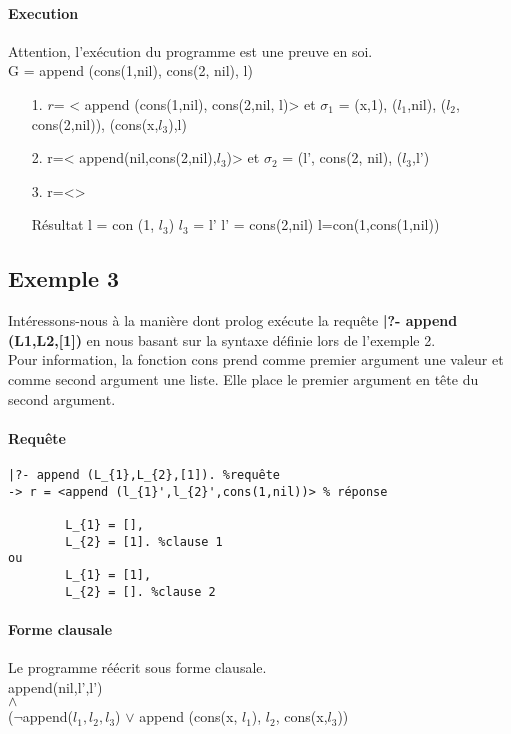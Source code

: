 \paragraph{Execution}
Attention, l'exécution du programme est une preuve en soi.\\
G = append (cons(1,nil), cons(2, nil), l)
\begin{itemize}
\item[1.] 
		$r$= < append (cons(1,nil), cons(2,nil, l)> et
		$\sigma_1$ = {(x,1), ($l_1$,nil), ($l_2$, cons(2,nil)), (cons(x,$l_3$),l)}
\item[2.]
		r=< append(nil,cons(2,nil),$l_3$)> et
		$\sigma_2$ = { (l', cons(2, nil), ($l_3$,l') }
		
\item[3.]
		r=<>
		
\item[Résultat]
l = con (1, $l_3$)
$l_3$ = l'
l' = cons(2,nil)
l=con(1,cons(1,nil))


\end{itemize}

\subsection{Exemple 3}

Intéressons-nous à la manière dont prolog exécute la requête \textbf{|?- append (L1,L2,[1])} en nous basant sur la syntaxe définie lors de l'exemple 2.\\
Pour information, la fonction cons prend comme premier argument une valeur et comme second argument une liste. Elle place le premier argument en tête du second argument.\\

\paragraph{Requête}
\begin{verbatim} 
|?- append (L_{1},L_{2},[1]). %requête
-> r = <append (l_{1}',l_{2}',cons(1,nil))> % réponse

		L_{1} = [],
		L_{2} = [1]. %clause 1
ou		
		L_{1} = [1],
		L_{2} = []. %clause 2
\end{verbatim}

\paragraph{Forme clausale}
Le programme réécrit sous forme clausale.\\
append(nil,l',l')\\
$\land$\\
($\neg$append($l_{1},l_{2},l_{3}$)
$\vee$ append (cons(x, $l_{1}$), $l_{2}$, cons(x,$l_{3}$))

